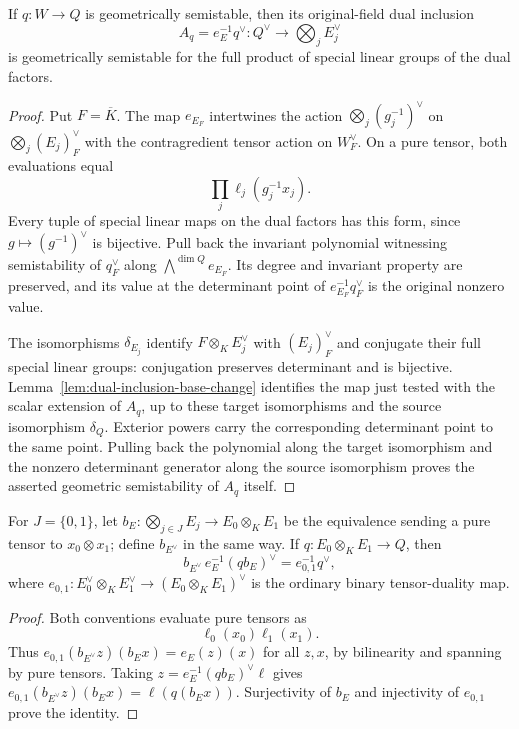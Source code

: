 \begin{lemma}
\label{lem:geometric-dual-quotient}
\leanok
If $q:W\to Q$ is geometrically semistable, then its original-field dual
inclusion
\[
 A_q=e_E^{-1}q^\vee:Q^\vee\longrightarrow\bigotimes_jE_j^\vee
\]
is geometrically semistable for the full product of special linear groups
of the dual factors.
\end{lemma}
\begin{proof}
Put $F=\overline K$. The map $e_{E_F}$ intertwines the action
$\bigotimes_j(g_j^{-1})^\vee$ on $\bigotimes_j(E_j)_F^\vee$ with the
contragredient tensor action on $W_F^\vee$. On a pure tensor, both
evaluations equal
\[
 \prod_j\ell_j(g_j^{-1}x_j).
\]
Every tuple of special linear maps on the dual factors has this form,
since $g\mapsto(g^{-1})^\vee$ is bijective. Pull back the invariant
polynomial witnessing semistability of $q_F^\vee$ along
$\bigwedge^{\dim Q}e_{E_F}$. Its degree and invariant property are preserved,
and its value at the determinant point of $e_{E_F}^{-1}q_F^\vee$ is the
original nonzero value.

The isomorphisms $\delta_{E_j}$ identify $F\otimes_KE_j^\vee$ with
$(E_j)_F^\vee$ and conjugate their full special linear groups: conjugation
preserves determinant and is bijective. Lemma~\ref{lem:dual-inclusion-base-change}
identifies the map just tested with the scalar extension of $A_q$, up to
these target isomorphisms and the source isomorphism $\delta_Q$.
Exterior powers carry the corresponding determinant point to the same point.
Pulling back the polynomial along the target isomorphism and the nonzero
determinant generator along the source isomorphism proves the asserted
geometric semistability of $A_q$ itself.
\end{proof}

\begin{lemma}
\label{lem:binary-dual-inclusion}
\leanok
For $J=\{0,1\}$, let $b_E:\bigotimes_{j\in J}E_j\to E_0\otimes_KE_1$
be the equivalence sending a pure tensor to $x_0\otimes x_1$; define
$b_{E^\vee}$ in the same way. If $q:E_0\otimes_KE_1\to Q$, then
\[
 b_{E^\vee}\, e_E^{-1}(q b_E)^\vee
       = e_{0,1}^{-1}q^\vee,
\]
where $e_{0,1}:E_0^\vee\otimes_KE_1^\vee\to(E_0\otimes_KE_1)^\vee$
is the ordinary binary tensor-duality map.
\end{lemma}
\begin{proof}
Both conventions evaluate pure tensors as
\[
 \ell_0(x_0)\ell_1(x_1).
\]
Thus
$e_{0,1}(b_{E^\vee}z)(b_Ex)=e_E(z)(x)$ for all $z,x$, by bilinearity
and spanning by pure tensors. Taking $z=e_E^{-1}(qb_E)^\vee\ell$ gives
$e_{0,1}(b_{E^\vee}z)(b_Ex)=\ell(q(b_Ex))$.
Surjectivity of $b_E$ and injectivity of $e_{0,1}$ prove the identity.
\end{proof}

